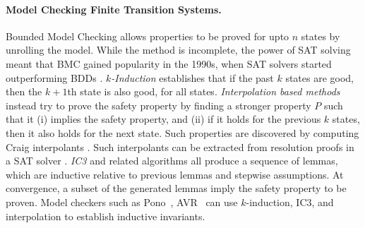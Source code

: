\paragraph{Model Checking Finite Transition Systems.}
Bounded Model Checking allows properties to be proved for upto $n$ states by unrolling the model.
While the method is incomplete, the power of SAT solving meant that BMC gained popularity in the 1990s,
when SAT solvers started outperforming BDDs \cite{biere1999symbolic}.
\emph{$k$-Induction} \cite{sheeran2000checking} establishes that if the past $k$ states are good, then the $k+1$th state is also good,
for all states.
\emph{Interpolation based methods} instead try to prove the safety property
by finding a stronger property $P$ such that it
(i) implies the safety property, and
(ii) if it holds for the previous $k$ states, then it also holds for the next state.
Such properties are discovered by computing Craig interpolants \cite{craig1957linear}.
Such interpolants can be extracted from resolution proofs in a SAT solver \cite{mcmillan2003interpolation}.
\emph{IC3} \cite{bradley2011sat} and related algorithms all produce a sequence of lemmas,
which are inductive relative to previous lemmas and stepwise assumptions.
At convergence, a subset of the generated lemmas imply the safety property to be proven.
Model checkers such as Pono~\cite{mann2021pono}, AVR~\cite{goel2020avr} can use $k$-induction,
IC3, and interpolation to establish inductive invariants.

